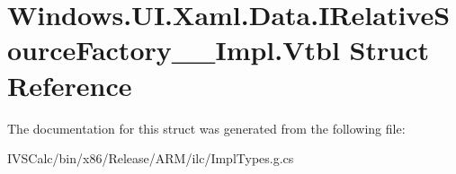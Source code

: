 \hypertarget{struct_windows_1_1_u_i_1_1_xaml_1_1_data_1_1_i_relative_source_factory_____impl_1_1_vtbl}{}\section{Windows.\+U\+I.\+Xaml.\+Data.\+I\+Relative\+Source\+Factory\+\_\+\+\_\+\+Impl.\+Vtbl Struct Reference}
\label{struct_windows_1_1_u_i_1_1_xaml_1_1_data_1_1_i_relative_source_factory_____impl_1_1_vtbl}


The documentation for this struct was generated from the following file\+:\begin{DoxyCompactItemize}
\item 
I\+V\+S\+Calc/bin/x86/\+Release/\+A\+R\+M/ilc/Impl\+Types.\+g.\+cs\end{DoxyCompactItemize}
